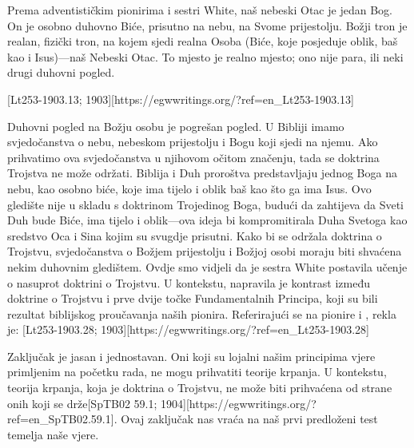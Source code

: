 Prema adventističkim pionirima i sestri White, naš nebeski Otac je jedan Bog. On je osobno duhovno Biće, prisutno na nebu, na Svome prijestolju. Božji tron je realan, fizički tron, na kojem sjedi realna Osoba (Biće, koje posjeduje oblik, baš kao i Isus)—naš Nebeski Otac. To mjesto je realno mjesto; ono nije para, ili neki drugi duhovni pogled.

[Lt253-1903.13; 1903][https://egwwritings.org/?ref=en\_Lt253-1903.13]

Duhovni pogled na Božju osobu je pogrešan pogled. U Bibliji imamo svjedočanstva o nebu, nebeskom prijestolju i Bogu koji sjedi na njemu. Ako prihvatimo ova svjedočanstva u njihovom očitom značenju, tada se doktrina Trojstva ne može održati. Biblija i Duh proroštva predstavljaju jednog Boga na nebu, kao osobno biće, koje ima tijelo i oblik baš kao što ga ima Isus. Ovo gledište nije u skladu s doktrinom Trojedinog Boga, budući da zahtijeva da Sveti Duh bude Biće, ima tijelo i oblik—ova ideja bi kompromitirala Duha Svetoga kao sredstvo Oca i Sina kojim su svugdje prisutni. Kako bi se održala doktrina o Trojstvu, svjedočanstva o Božjem prijestolju i Božjoj osobi moraju biti shvaćena nekim duhovnim gledištem. Ovdje smo vidjeli da je sestra White postavila učenje o  nasuprot doktrini o Trojstvu. U kontekstu, napravila je kontrast između doktrine o Trojstvu i prve dvije točke Fundamentalnih Principa, koji su bili rezultat biblijskog proučavanja naših pionira. Referirajući se na pionire i , rekla je: [Lt253-1903.28; 1903][https://egwwritings.org/?ref=en\_Lt253-1903.28]

Zaključak je jasan i jednostavan. Oni koji su lojalni našim principima vjere primljenim na početku rada, ne mogu prihvatiti teorije krpanja. U kontekstu, teorija krpanja, koja je doktrina o Trojstvu, ne može biti prihvaćena od strane onih koji se drže[SpTB02 59.1; 1904][https://egwwritings.org/?ref=en\_SpTB02.59.1]. Ovaj zaključak nas vraća na naš prvi predloženi test temelja naše vjere.

